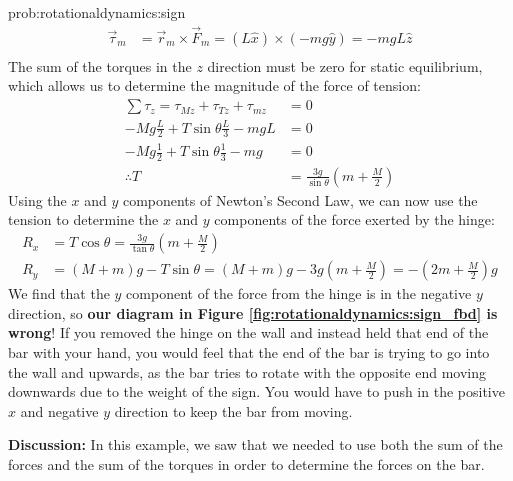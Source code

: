 \begin{solution}{prob:rotationaldynamics:sign}
\begin{align*}
\vec \tau_m &= \vec r_m \times \vec F_m = (L\hat x) \times (-mg \hat y) =-mgL\hat z\\
\end{align*}
The sum of the torques in the $z$ direction must be zero for static equilibrium, which allows us to determine the magnitude of the force of tension:
\begin{align*}
\sum \tau_z = \tau_{Mz} + \tau_{Tz}+ \tau_{mz} &=0\\
-Mg\frac{L}{2} + T\sin\theta\frac{L}{3} -mgL &=0\\
-Mg\frac{1}{2} + T\sin\theta\frac{1}{3} -mg &=0\\
\therefore T&= \frac{3g}{\sin\theta} \left( m + \frac{M}{2}\right)
\end{align*}
Using the $x$ and $y$ components of Newton's Second Law, we can now use the tension to determine the $x$ and $y$ components of the force exerted by the hinge:
\begin{align*}
R_x &= T\cos\theta = \frac{3g}{\tan\theta} \left( m + \frac{M}{2}\right)\\
R_y &= (M+m)g - T\sin\theta = (M+m)g - 3g \left( m + \frac{M}{2}\right)=  -\left( 2m + \frac{M}{2}\right)g
\end{align*}
We find that the $y$ component of the force from the hinge is in the negative $y$ direction, so \textbf{our diagram in Figure \ref{fig:rotationaldynamics:sign_fbd} is wrong}! If you removed the hinge on the wall and instead held that end of the bar with your hand, you would feel that the end of the bar is trying to go into the wall and upwards, as the bar tries to rotate with the opposite end moving downwards due to the weight of the sign. You would have to push in the positive $x$ and negative $y$ direction to keep the bar from moving. 

\textbf{Discussion: }In this example, we saw that we needed to use both the sum of the forces and the sum of the torques in order to determine the forces on the bar. 
\end{solution}






